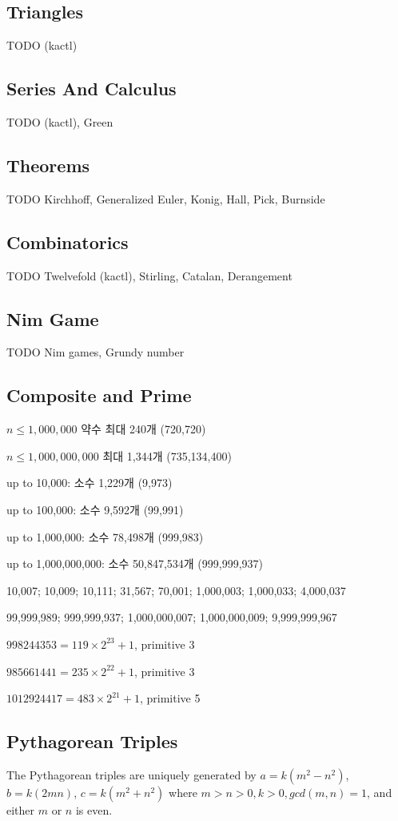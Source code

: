 \subsection{Triangles}
TODO (kactl)

\subsection{Series And Calculus}
TODO (kactl), Green

\subsection{Theorems}
TODO Kirchhoff, Generalized Euler, Konig, Hall, Pick, Burnside

\subsection{Combinatorics}
TODO Twelvefold (kactl), Stirling, Catalan, Derangement

\subsection{Nim Game}
TODO Nim games, Grundy number

\subsection{Composite and Prime}
$n \leq 1,000,000$ 약수 최대 240개 (720,720)

$n \leq 1,000,000,000$ 최대 1,344개 (735,134,400)

up to 10,000: 소수 1,229개 (9,973)

up to 100,000: 소수 9,592개 (99,991)

up to 1,000,000: 소수 78,498개 (999,983)

up to 1,000,000,000: 소수 50,847,534개 (999,999,937)

10,007; 10,009; 10,111; 31,567; 70,001; 1,000,003; 1,000,033; 4,000,037

99,999,989; 999,999,937; 1,000,000,007; 1,000,000,009; 9,999,999,967

$998244353 = 119 \times 2^{23} + 1$, primitive 3

$985661441 = 235 \times 2^{22} + 1$, primitive 3

$1012924417 = 483 \times 2^{21} + 1$, primitive 5

\subsection{Pythagorean Triples}
The Pythagorean triples are uniquely generated by $a=k(m^2-n^2)$, $b=k(2mn)$, $c=k(m^2+n^2)$ where $m>n>0, k>0, gcd(m,n)=1$, and either $m$ or $n$ is even.